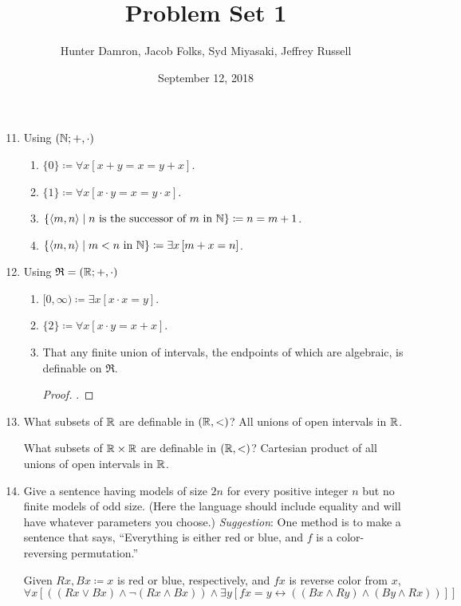 \documentclass{homework}
\title{Problem Set 1}
\author{Hunter Damron, Jacob Folks, Syd Miyasaki, Jeffrey Russell}
\date{September 12, 2018}
\begin{document}
	\maketitle
	\begin{enumerate}
		\setcounter{enumi}{10}
		\item Using $(\mathbb{N}; +, \cdot)$
		\begin{enumerate}
			\item $\{0\} \coloneqq \forall x \left[x + y = x = y + x\right]$.
			\item $\{1\} \coloneqq \forall x \left[x \cdot y = x = y \cdot x \right]$.
			\item $\{\langle m,n \rangle \mid n \text{ is the successor of } m \text{ in } \mathbb{N}\} \coloneqq n = m + 1$.
			\item $\{\langle m,n \rangle \mid m < n \text{ in } \mathbb{N}\} \coloneqq \exists x \left[m + x = n\right]$.
		\end{enumerate}
		\item Using $\mathfrak{R} = (\mathbb{R}; +, \cdot)$
		\begin{enumerate}
			\item $[0, \infty) \coloneqq \exists x \left[x \cdot x = y\right]$.
			\item $\{2\} \coloneqq \forall x [x \cdot y = x + x]$.
			\item That any finite union of intervals, the endpoints of which are algebraic, is definable on $\mathfrak{R}$.
			\begin{proof}
				\TODO.
			\end{proof}
		\end{enumerate}
		
		\setcounter{enumi}{13}
		\item What subsets of $\mathbb{R}$ are definable in $(\mathbb{R}, <)$? All unions of open intervals in $\mathbb{R}$. \par %
		What subsets of $\mathbb{R}\times\mathbb{R}$ are definable in $(\mathbb{R}, <)$? Cartesian product of all unions of open intervals in $\mathbb{R}$. %
		
		\setcounter{enumi}{15}
		\item Give a sentence having models of size $2n$ for every positive integer $n$ but no finite models of odd size. (Here the language should include equality and will have whatever parameters you choose.) \emph{Suggestion}: One method is to make a sentence that says, ``Everything is either red or blue, and $f$ is a color-reversing permutation.'' \par
		Given $Rx, Bx \coloneqq x$ is red or blue, respectively, and $fx$ is reverse color from $x$, 
		\[\forall x \left[\left( (Rx \lor Bx) \land \lnot(Rx \land Bx)\right) \land \exists y \left[fx = y \leftrightarrow \left((Bx \land Ry) \land (By \land Rx) \right) \right] \right]\]
	\end{enumerate}
\end{document}
